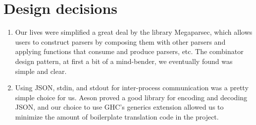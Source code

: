 \documentclass[11pt]{article}
\begin{document}
\section{Design decisions}
\begin{enumerate}
\item Our lives were simplified a great deal by the library Megaparsec, which allows users to construct parsers by composing them with other parsers and applying functions that consume and produce parsers, etc. The combinator design pattern, at first a bit of a mind-bender, we eventually found was simple and clear.
\item Using JSON, stdin, and stdout for inter-process communication was a pretty simple choice for us. Aeson proved a good library for encoding and decoding JSON, and our choice to use GHC's generics extension allowed us to minimize the amount of boilerplate translation code in the project.
\end{enumerate}
\end{document}
